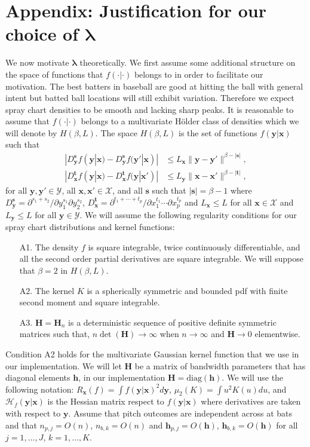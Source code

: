 \documentclass[11pt]{article}
\newcommand{\Y}{\mathcal{Y}}
\newcommand{\X}{\mathcal{X}}
\newcommand{\Hcal}{\mathcal{H}}
\newcommand{\Hbf}{\textbf{H}}
\newcommand{\y}{\textbf{y}}
\newcommand{\x}{\textbf{x}}
\newcommand{\h}{\textbf{h}}
\newcommand{\s}{\textbf{s}}
\newcommand{\tbf}{\textbf{t}}
\newcommand{\lambdabf}{\boldsymbol{\lambda}}
\begin{document}
\section*{Appendix: Justification for our choice of $\lambdabf$}

We now motivate $\lambdabf$ theoretically. We first assume some additional structure on the space of functions that $f(\cdot|\cdot)$ belongs to in order to facilitate our motivation. The best batters in baseball are good at hitting the ball with general intent but batted ball locations will still exhibit variation. Therefore we expect spray chart densities to be smooth and lacking sharp peaks. It is reasonable to assume that $f(\cdot|\cdot)$ belongs to a multivariate H{\"o}lder class of densities which we will denote by $H(\beta,L)$. The space $H(\beta,L)$ is the set of functions $f(\y|\x)$ such that 
\begin{align*}
|D_{\y}^\s f(\y|\x) - D_{\y}^\s f(\y'|\x)| &\leq L_\x\|\y - \y'\|^{\beta - |\s|}, \\
|D_{\x}^\tbf f(\y|\x) - D_{\x}^\tbf f(\y|\x')| &\leq L_\y\|\x - \x'\|^{\beta - |\tbf|}, 
\end{align*}
for all $\y,\y' \in \Y$, all $\x,\x' \in \X$, and all $\s$ such that $|\s| = \beta - 1$ where
$D_{\y}^\s = \partial^{s_1 + s_2}/\partial y_1^{s_1} \partial y_2^{s_2}$, 
$D_{\x}^\tbf = \partial^{t_1 + \cdots + t_p}/\partial x_1^{t_1} \cdots \partial x_p^{t_p}$ and $L_\x \leq L$ for all $\x \in \X$ and $L_\y \leq L$ for all $\y \in \Y$. 
We will assume the following regularity conditions for our spray chart distributions and kernel functions: 

\begin{itemize}
\item[A1.] The density $f$ is square integrable, twice continuously differentiable, and all the second order partial derivatives are square integrable. We will suppose that $\beta = 2$ in $H(\beta,L)$.
\item[A2.] The kernel $K$ is a spherically symmetric and bounded pdf with finite second moment and square integrable.
\item[A3.] $\Hbf = \Hbf_n$ is a deterministic sequence of positive definite symmetric matrices such that, $n\det(\Hbf) \to \infty$ when $n \to \infty$ and $\Hbf \to 0$ elementwise. 
\end{itemize}

Condition A2 holds for the multivariate Gaussian kernel function that we use in our implementation.
We will let $\Hbf$ be a matrix of bandwidth parameters that has diagonal elements $\h$, in our implementation $\Hbf = \text{diag}(\h)$. We will use the following notation: $R_{\x}(f) = \int f(\y|\x)^2 d\y$, $\mu_2(K) = \int u^2K(u)du$, and $\Hcal_f(\y|\x)$ is the Hessian matrix respect to $f(\y|\x)$ where derivatives are taken with respect to $\y$. Assume that pitch outcomes are independent across at bats and that $n_{p,j} = O(n)$, $n_{b,k} = O(n)$ and $\h_{p,j} = O(\h)$, $\h_{b,k} = O(\h)$ for all $j = 1, \ldots, J$, $k = 1, \ldots, K$. 
\end{document}
